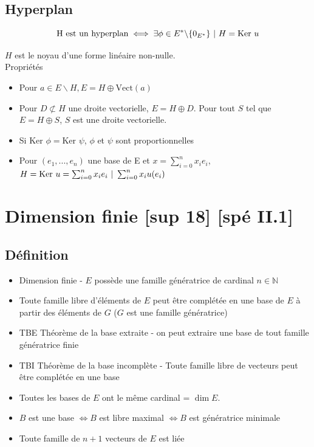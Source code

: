 \documentclass[openany]{book}
\begin{document}
\subsection{Hyperplan}
\[ \text{H est un hyperplan} \iff \exists \phi \in E^* \backslash \{0_{E^*}\} \text{ } | \text{ } H = \text{Ker }u \]

\noindent $H$ est le noyau d'une forme linéaire non-nulle. \\

\noindent Propriétés
\begin{itemize}
    \item Pour $a \in E \backslash H, E = H \oplus \text{Vect}(a)$
    \item Pour $D \not \subset H $ une droite vectorielle, $ E = H \oplus D $. Pour tout $S$ tel que $E = H \oplus S$, $S$ est une droite vectorielle. 
    \item Si $ \text{Ker }\phi  = \text{Ker }\psi$, $\phi$ et $\psi$ sont proportionnelles
    \item Pour $ (e_1,...,e_n) $ une base de E et $x = \sum_{i=0}^n x_i e_i$, $ H = \text{Ker }u = {\sum_{i=0}^n x_i e_i \text{ } | \text{ } \sum_{i=0}^n x_i u(e_i)} $
\end{itemize}

\clearpage

\section{Dimension finie [sup 18] [spé II.1]}
\subsection{Définition}
\begin{itemize}
    \item Dimension finie - $E$ possède une famille génératrice de cardinal $n \in \mathbb{N}$
    \item Toute famille libre d'éléments de $E$ peut être complétée en une base de $E$ à partir des éléments de $G$ ($G$ est une famille génératrice) 
    \item TBE Théorème de la base extraite - on peut extraire une base de tout famille génératrice finie 
    \item TBI Théorème de la base incomplète - Toute famille libre de vecteurs peut être complétée en une base
    \item Toutes les bases de $E$ ont le même cardinal = $\dim E$. 
    \item $B$ est une base $ \iff B $ est libre maximal $\iff B $ est génératrice minimale
    \item Toute famille de $n+1$ vecteurs de $E$ est liée
\end{itemize}
\end{document}
